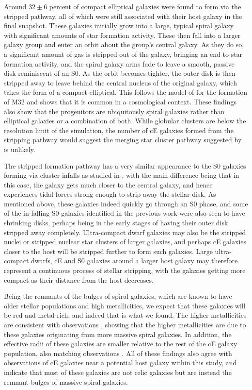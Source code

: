\documentclass[a4paper,fleqn,usenatbib]{mnras}
\begin{document}
Around $32\pm6$ percent of compact elliptical galaxies were found to form via the stripped pathway, all of which were still associated with their host galaxy in the final snapshot. These galaxies initially grow into a large, typical spiral galaxy with significant amounts of star formation activity. These then fall into a larger galaxy group and enter an orbit about the group's central galaxy. As they do so, a significant amount of gas is stripped out of the galaxy, bringing an end to star formation activity, and the spiral galaxy arms fade to leave a smooth, passive disk reminiscent of an S0. As the orbit becomes tighter, the outer disk is then stripped away to leave behind the central nucleus of the original galaxy, which takes the form of a compact elliptical. This follows the model of \citep{2001ApJ...557L..39B} for the formation of M32 and shows that it is common in a cosmological context. These findings also show that the progenitors are ubiquitously spiral galaxies rather than elliptical galaxies or a combination of both. While globular clusters are below the resolution limit of the simulation, the number of cE galaxies formed from the stripping pathway would suggest the merging star cluster pathway suggested by \citep{2019MNRAS.489.2746U} is unlikely. 

The stripped formation pathway has a very similar appearance to the S0 galaxies forming via cluster infalls as studied in \citet{2021MNRAS.508..895D}, with the main difference being that in this case, the galaxy gets much closer to the central galaxy, and hence experiences tidal forces strong enough to strip away the stellar disk. As mentioned above, these galaxies indeed quickly go through an S0 phase, and some of the in-falling S0 galaxies identified in the previous work were also seen to have shrinking disks, perhaps being in the early stages of having their outer disk stripped away completely. Ultra-compact dwarf galaxies may also be the stripped nuclei \citep{2021MNRAS.501.1852M} or stripped nuclear star clusters \citep{2020A&ARv..28....4N} of larger galaxies, and perhaps cE galaxies closer to the host will be stripped further to form such galaxies. Large ultra-compact dwarfs, cE and S0 galaxies around a larger host galaxy may therefore represent a continuous process of stellar stripping, with the galaxies getting more compact as their distance from the host decreases.  

Being the remnants of the bulges of spiral galaxies, which are known to have older stellar populations and high metallicities, we expect that these galaxies will be red and metal-rich, and indeed that is what we found. The higher metallicities are consistent with observations \citep{2020ApJ...903...65K}, showing that the higher metallicities are due to these galaxies originating from more massive spiral galaxies. In addition, the effective radii of these galaxies are smaller relative to the rest of the cE galaxy population, also matching observations \citep{2015ApJ...807..139F}. All of these findings also agree with observations of cE galaxies near a potential host galaxy within this study, and indicate that most of these galaxies are not relic galaxies but are instead the remnant bulges of massive spiral galaxies. 
\end{document}
